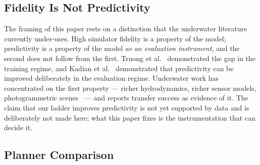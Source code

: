\subsection{Fidelity Is Not Predictivity}

The framing of this paper rests on a distinction that the underwater
literature currently under-uses. High simulator fidelity is a property of the
model; predictivity is a property of the model \emph{as an evaluation
instrument}, and the second does not follow from the first. Truong et
al.~\cite{truong2022rethinki} demonstrated the gap in the training regime,
and Kadian et al.~\cite{kadian2020simrealp} demonstrated that predictivity
can be improved deliberately in the evaluation regime. Underwater work has
concentrated on the first property --- richer hydrodynamics, richer sensor
models, photogrammetric
scenes~\cite{benzon2022anopenso,orjales2025towardsa,mari2026deeprein} --- and
reports transfer success as evidence of it. The claim that our ladder
improves predictivity is not yet supported by data and is deliberately not
made here; what this paper fixes is the instrumentation that can decide it.
\SREAL

\subsection{Planner Comparison}

\PEIGHT
